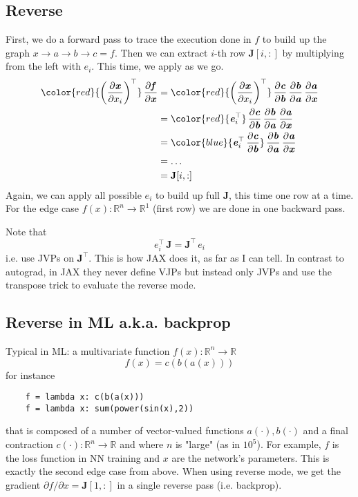 \documentclass[paper=a4,11pt,headsepline]{scrartcl}
\newcommand{\ve}[1]{\ensuremath{\bm{\mathit{#1}}}}
\newcommand{\ma}[1]{\ensuremath{\bm{\mathbf{#1}}}}
\newcommand{\ra}{\ensuremath{\rightarrow}}
\newcommand{\pd}[2]{\dfrac{\partial #1}{\partial #2}}
\newcommand{\pdi}[2]{\partial #1/\partial #2}
\newcommand{\red}[1]{{\color{red}{#1}}}
\newcommand{\blue}[1]{{\color{blue}{#1}}}
\begin{document}
\subsection{Reverse}

First, we do a forward pass to trace the execution done in $\ve f$ to build up the graph
$\ve x\ra \ve a\ra \ve b\ra \ve c = \ve f$.
Then we can extract $i$-th row $\ma J[i,:]$ by multiplying from the left with
$\ve e_i$. This time, we apply \blue{vector Jacobian products (VJPs)} as we go.
\begin{align*}
    \red{\left(\pd{\ve x}{x_i}\right)^\top}\,\pd{\ve f}{\ve x}
        &= \red{\left(\pd{\ve x}{x_i}\right)^\top}\,\pd{\ve c}{\ve b}\,\pd{\ve b}{\ve a}\,\pd{\ve a}{\ve x}\\
        &= \red{\ve e_i^\top}\,\pd{\ve c}{\ve b}\,\pd{\ve b}{\ve a}\,\pd{\ve a}{\ve x}\\
        &= \blue{\ve e_i^\top\,\pd{\ve c}{\ve b}}\,\pd{\ve b}{\ve a}\,\pd{\ve a}{\ve x}\\
        &= \ldots\\
        &= \ma J[i,:]
\end{align*}
Again, we can apply all possible $\ve e_i$ to build up full $\ma J$, this time one row at
a time. For the edge case $f(\ve x): \mathbb R^n \ra \mathbb R^1$ (first row)
we are done in one backward pass.

Note that
\begin{equation*}
    \ve e_i^\top\,\ma J = \ma J^\top\,\ve e_i
\end{equation*}
i.e. use JVPs on $\ma J^\top$. This is how JAX does it, as far as I can tell.
In contrast to autograd, in JAX
they never define VJPs but instead only JVPs and use the transpose trick
to evaluate the reverse mode.

\subsection{Reverse in ML a.k.a. backprop}

Typical in ML: a multivariate function $f(\ve x): \mathbb R^n\ra \mathbb R$
\begin{equation*}
    f(\ve x) = c(\ve b(\ve a(\ve x)))
\end{equation*}
for instance
\begin{verbatim}
    f = lambda x: c(b(a(x)))
    f = lambda x: sum(power(sin(x),2))
\end{verbatim}
that is composed of a number of vector-valued functions $\ve a(\cdot), \ve
b(\cdot)$ and a final contraction $c(\cdot): \mathbb R^n\ra \mathbb R$ and where $n$ is "large" (as in $10^5$).
For example, $f$ is the loss function in NN training and $\ve x$ are the
network's parameters. This is exactly the second edge case from above. When
using reverse mode, we get the gradient $\pdi{f}{\ve x} = \ma J[1,:]$
in a single reverse pass (i.e. backprop).
\end{document}

